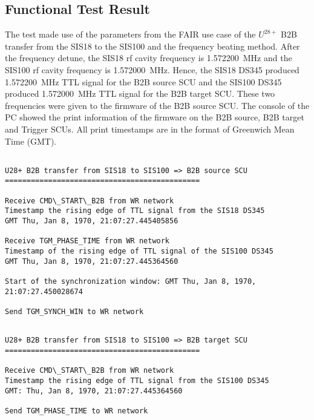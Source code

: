 \subsection{Functional Test Result}
\label{sec:function_result}
The test made use of the parameters from the FAIR use case of the $U^{28+}$ B2B transfer from the SIS18 to the SIS100 and the frequency beating method. After the frequency detune, the SIS18 rf cavity frequency is \SI{1.572200}{\MHz} and the SIS100 rf cavity frequency is \SI{1.572000}{\MHz}. Hence, the SIS18 DS345 produced \SI{1.572200}{\MHz} TTL signal for the B2B source SCU and the SIS100 DS345 produced \SI{1.572000}{\MHz} TTL signal for the B2B target SCU. These two frequencies were given to the firmware of the B2B source SCU. The console of the PC showed the print information of the firmware on the B2B source, B2B target and Trigger SCUs. All print timestamps are in the format of Greenwich Mean Time (GMT). 
\begin{lstlisting}[language={[ANSI]C}, keywordstyle=\color{blue!70}, commentstyle=\color{red!50!green!50!blue!50}, frame=shadowbox, rulesepcolor=\color{red!20!green!20!blue!20}]

U28+ B2B transfer from SIS18 to SIS100 => B2B source SCU
=============================================

Receive CMD\_START\_B2B from WR network
Timestamp the rising edge of TTL signal from the SIS18 DS345 
GMT Thu, Jan 8, 1970, 21:07:27.445405856

Receive TGM_PHASE_TIME from WR network
Timestamp of the rising edge of TTL signal of the SIS100 DS345 
GMT Thu, Jan 8, 1970, 21:07:27.445364560

Start of the synchronization window: GMT Thu, Jan 8, 1970, 21:07:27.450028674

Send TGM_SYNCH_WIN to WR network
\end{lstlisting}

\begin{lstlisting}[language={[ANSI]C}, keywordstyle=\color{blue!70}, commentstyle=\color{red!50!green!50!blue!50}, frame=shadowbox, rulesepcolor=\color{red!20!green!20!blue!20}]

U28+ B2B transfer from SIS18 to SIS100 => B2B target SCU
=============================================

Receive CMD\_START\_B2B from WR network
Timestamp the rising edge of TTL signal from the SIS100 DS345 
GMT: Thu, Jan 8, 1970, 21:07:27.445364560

Send TGM_PHASE_TIME to WR network
\end{lstlisting}

